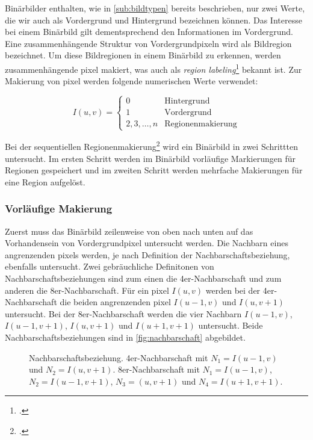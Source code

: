 Binärbilder enthalten, wie in \autoref{sub:bildtypen} bereits beschrieben, nur zwei Werte, die wir auch als Vordergrund
 und Hintergrund bezeichnen können. Das Interesse bei einem Binärbild gilt dementsprechend den Informationen im
 Vordergrund. Eine zusammenhängende Struktur von Vordergrundpixeln wird als Bildregion bezeichnet. Um diese
 Bildregionen in einem Binärbild zu erkennen, werden zusammenhängende \gls{pixel} makiert, was auch als
 \textit{region labeling}\footcite[Vgl.][S.~196]{burger05} bekannt ist. Zur Makierung von \gls{pixel} werden folgende
 numerischen Werte verwendet:

\begin{equation*}
	I(u,v) = \begin{cases}
	0 & \textrm{Hintergrund}\\
	1 & \textrm{Vordergrund}\\
	2,3,\ldots,n & \textrm{Regionenmakierung}
	\end{cases}
\end{equation*}

Bei der sequentiellen Regionenmakierung\footcite[Vgl.][S.~200--206]{burger05} wird ein Binärbild in zwei Schrittten
 untersucht. Im ersten Schritt werden im Binärbild vorläufige Markierungen für Regionen gespeichert und im zweiten
 Schritt werden mehrfache Makierungen für eine Region aufgelöst.

\subsubsection{Vorläufige Makierung} %
\label{sec:vorläufige_makierung}

Zuerst muss das Binärbild zeilenweise von oben nach unten auf das Vorhandensein von Vordergrundpixel untersucht werden.
Die Nachbarn eines angrenzenden \glspl{pixel} werden, je nach Definition der Nachbarschaftsbeziehung, ebenfalls
 untersucht. Zwei gebräuchliche Definitonen von Nachbarschaftsbeziehungen sind zum einen die 4er-Nachbarschaft und zum
 anderen die 8er-Nachbarschaft. Für ein \gls{pixel} $I(u,v)$ werden bei der 4er-Nachbarschaft die beiden angrenzenden
 \gls{pixel} $I(u-1,v)$ und $I(u,v+1)$ untersucht. Bei der 8er-Nachbarschaft werden die vier Nachbarn $I(u-1,v)$,
 $I(u-1,v+1)$, $I(u,v+1)$ und $I(u+1,v+1)$ untersucht. Beide Nachbarschaftsbeziehungen sind in
 \autoref{fig:nachbarschaft} abgebildet.

\begin{figure}[!ht]
	\centering
	\subfigure[]{
		\label{fig:4er-nachbarschaft}
		
	}
	\subfigure[]{
		\label{fig:8er-nachbarschaft}
		
	}
	\caption{Nachbarschaftsbeziehung.  4er-Nachbarschaft mit $N_1 = I(u-1,v)$ und
	 $N_2 = I(u,v+1)$.  8er-Nachbarschaft mit $N_1 = I(u-1,v)$, $N_2 = I(u-1,v+1)$,
	 $N_3 = (u,v+1)$ und $N_4 = I(u+1,v+1)$.}
	\label{fig:nachbarschaft}
\end{figure}

